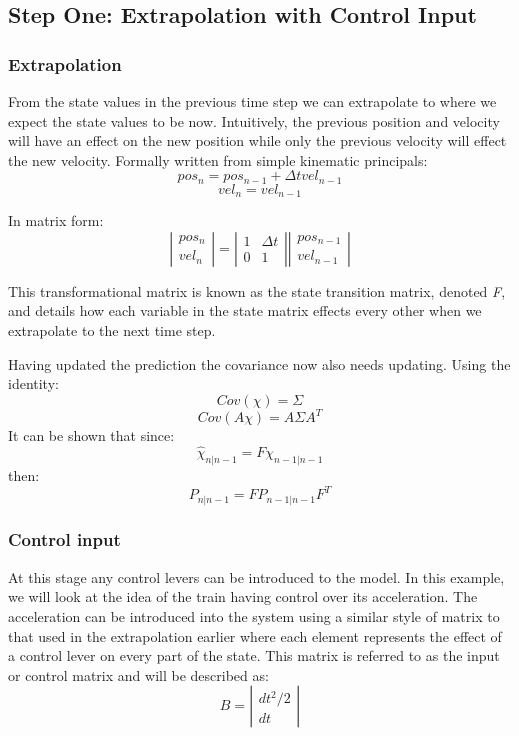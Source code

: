 \documentclass[12pt]{article}
\begin{document}
\subsection{Step One: Extrapolation with Control Input}
\subsubsection{Extrapolation}
From the state values in the previous time step we can extrapolate to where we expect the state values to be now. Intuitively, the previous position and velocity will have an effect on the new position while only the previous velocity will effect the new velocity. Formally written from simple kinematic principals:
\[pos_n = pos_{n-1} + \Delta t vel_{n-1}\]
\[vel_n = vel_{n-1}\]

In matrix form:
\[\left |  \begin{array}{c}
pos_n \\
vel_n
\end{array}  \right |
= 
\left |  \begin{array}{cc}
1 & \Delta t \\
0 & 1
\end{array}  \right |
\left |  \begin{array}{c}
pos_{n-1} \\
vel_{n-1}
\end{array}  \right |\]

This transformational matrix is known as the state transition matrix, denoted \textit{F},  and details how each variable in the state matrix effects every other when we extrapolate to the next time step.\par 
	Having updated the prediction the covariance now also needs updating. Using the identity:
\[Cov(\chi) = \Sigma\]
\[Cov(A\chi) = A \Sigma A^T\]
It can be shown that since:
\[\hat{\chi}_{n|n-1} = F\chi_{n-1|n-1} \]
then:
\[P_{n|n-1} = FP_{n-1|n-1}F^T\]

\subsubsection{Control input}
	At this stage any control levers can be introduced to the model. In this example, we will look at the idea of the train having control over its acceleration. The acceleration can be introduced into the system using a similar style of matrix to that used in the extrapolation earlier where each element represents the effect of a control lever on every part of the state. This matrix is referred to as the input or control matrix and will be described as:
\[B
=
\left |  \begin{array}{c}
dt^2/2 \\
dt
\end{array}  \right |\]
\end{document}
